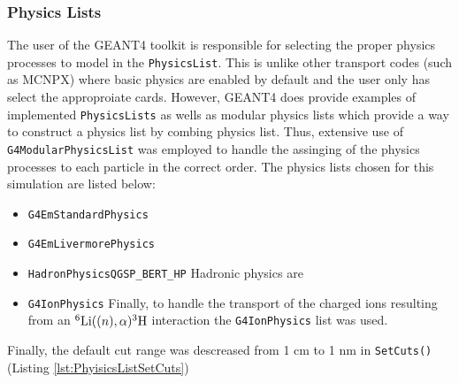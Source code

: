 \subsubsection{Physics Lists}
The user of the GEANT4 toolkit is responsible for selecting the proper physics processes to model in the \verb+PhysicsList+.
This is unlike other transport codes (such as MCNPX) where basic physics are enabled by default and the user only has select the approproiate cards.
However, GEANT4 does provide examples of implemented \verb+PhysicsLists+ as wells as modular physics lists which provide a way to construct a physics list by combing physics list.
Thus, extensive use of \verb+G4ModularPhysicsList+ was employed to handle the assinging of the physics processes to each particle in the correct order.
The physics lists chosen for this simulation are listed below:
\begin{itemize}
    \item \verb+G4EmStandardPhysics+
    \item \verb+G4EmLivermorePhysics+
    \item \verb+HadronPhysicsQGSP_BERT_HP+ Hadronic physics are
    \item \verb+G4IonPhysics+ Finally, to handle the transport of the charged ions resulting from an ${}^6\text{Li}(\text(n),\alpha){}^{3}\text{H}$ interaction the \verb+G4IonPhysics+ list was used.
\end{itemize}

Finally, the default cut range was descreased from 1 cm to 1 nm in \verb+SetCuts()+ (Listing \ref{lst:PhyisicsListSetCuts}) 


